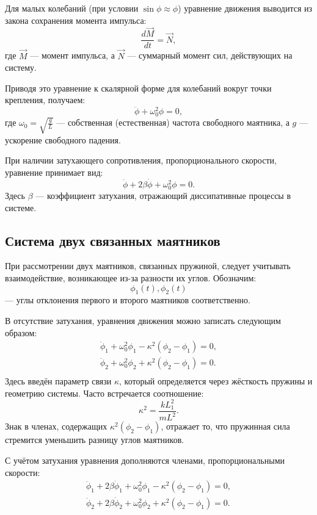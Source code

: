 \documentclass[a4paper,11pt]{article}
\theoremstyle{definition}
\begin{document}
Для малых колебаний (при условии \(\sin \phi \approx \phi\)) уравнение движения выводится из закона 
сохранения момента импульса:
\[
\frac{d\vec{M}}{dt} = \vec{N},
\]
где \(\vec{M}\) --- момент импульса, а \(\vec{N}\) --- суммарный момент сил, действующих на систему.

Приводя это уравнение к скалярной форме для колебаний вокруг точки крепления, получаем:
\[
\ddot{\phi} + \omega_0^2 \phi = 0,
\]
где \(\omega_0 = \sqrt{\frac{g}{L}}\) --- собственная (естественная) частота свободного маятника, 
а \(g\) --- ускорение свободного падения.

При наличии затухающего сопротивления, пропорционального скорости, уравнение принимает вид:
\[
\ddot{\phi} + 2\beta\dot{\phi} + \omega_0^2 \phi = 0.
\]
Здесь \(\beta\) --- коэффициент затухания, отражающий диссипативные процессы в системе.



\subsection*{Система двух связанных маятников}
При рассмотрении двух маятников, связанных пружиной, следует учитывать взаимодействие, возникающее 
из-за разности их углов. Обозначим:
\[
\phi_1(t), \phi_2(t)
\]
--- углы отклонения первого и второго маятников соответственно.

В отсутствие затухания, уравнения движения можно записать следующим образом:
\begin{gather}
    \ddot{\phi}_1 + \omega_0^2 \phi_1 - \kappa^2 (\phi_2 - \phi_1) = 0,\\
    \ddot{\phi}_2 + \omega_0^2 \phi_2 + \kappa^2 (\phi_2 - \phi_1) = 0.\\
\end{gather}
Здесь введён параметр связи \(\kappa\), который определяется через жёсткость пружины и геометрию 
системы. Часто встречается соотношение:
\[
\kappa^2 = \frac{k L_1^2}{mL^2}.
\]
Знак в членах, содержащих \(\kappa^2(\phi_2 - \phi_1)\), отражает то, что пружинная сила стремится 
уменьшить разницу углов маятников.

С учётом затухания уравнения дополняются членами, пропорциональными скорости:
\begin{gather}
    \ddot{\phi}_1 + 2\beta\dot{\phi}_1 + \omega_0^2 \phi_1 - \kappa^2 (\phi_2 - \phi_1) = 0,\\
    \ddot{\phi}_2 + 2\beta\dot{\phi}_2 + \omega_0^2 \phi_2 + \kappa^2 (\phi_2 - \phi_1) = 0.\\
\end{gather}
\end{document}

